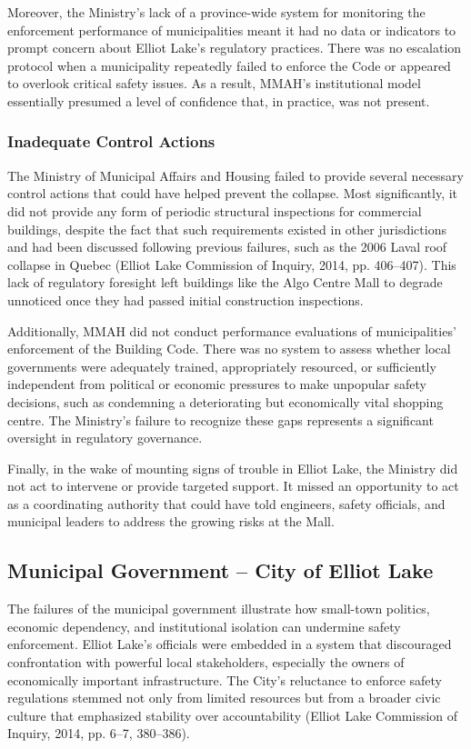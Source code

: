 \documentclass[12pt]{article}
\begin{document}
Moreover, the Ministry’s lack of a province-wide system for monitoring the enforcement performance of municipalities meant it had no data or indicators to prompt concern about Elliot Lake’s regulatory practices. There was no escalation protocol when a municipality repeatedly failed to enforce the Code or appeared to overlook critical safety issues. As a result, MMAH’s institutional model essentially presumed a level of confidence that, in practice, was not present.

\subsubsection*{Inadequate Control Actions}
The Ministry of Municipal Affairs and Housing failed to provide several necessary control actions that could have helped prevent the collapse. Most significantly, it did not provide any form of periodic structural inspections for commercial buildings, despite the fact that such requirements existed in other jurisdictions and had been discussed following previous failures, such as the 2006 Laval roof collapse in Quebec (Elliot Lake Commission of Inquiry, 2014, pp. 406–407). This lack of regulatory foresight left buildings like the Algo Centre Mall to degrade unnoticed once they had passed initial construction inspections.

Additionally, MMAH did not conduct performance evaluations of municipalities’ enforcement of the Building Code. There was no system to assess whether local governments were adequately trained, appropriately resourced, or sufficiently independent from political or economic pressures to make unpopular safety decisions, such as condemning a deteriorating but economically vital shopping centre. The Ministry’s failure to recognize these gaps represents a significant oversight in regulatory governance.

Finally, in the wake of mounting signs of trouble in Elliot Lake, the Ministry did not act to intervene or provide targeted support. It missed an opportunity to act as a coordinating authority that could have told engineers, safety officials, and municipal leaders to address the growing risks at the Mall.

\subsection{Municipal Government – City of Elliot Lake}
The failures of the municipal government illustrate how small-town politics, economic dependency, and institutional isolation can undermine safety enforcement. Elliot Lake’s officials were embedded in a system that discouraged confrontation with powerful local stakeholders, especially the owners of economically important infrastructure. The City’s reluctance to enforce safety regulations stemmed not only from limited resources but from a broader civic culture that emphasized stability over accountability (Elliot Lake Commission of Inquiry, 2014, pp. 6–7, 380–386).
\end{document}

